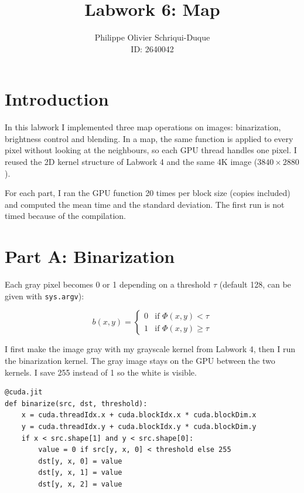 \documentclass{report}
\begin{document}
\title{Labwork 6: Map}
\author{Philippe Olivier Schriqui-Duque \\ ID: 2640042}
\date{}
\maketitle

\section*{Introduction}

In this labwork I implemented three map operations on images: binarization, brightness control and blending. In a map, the same function is applied to every pixel without looking at the neighbours, so each GPU thread handles one pixel. I reused the 2D kernel structure of Labwork 4 and the same 4K image ($3840 \times 2880$).

For each part, I ran the GPU function 20 times per block size (copies included) and computed the mean time and the standard deviation. The first run is not timed because of the compilation.

\section*{Part A: Binarization}

Each gray pixel becomes 0 or 1 depending on a threshold $\tau$ (default 128, can be given with \texttt{sys.argv}):

\[
b(x, y) = \left\{ \begin{array}{ll} 0 & \mbox{if } \Phi(x, y) < \tau \\ 1 & \mbox{if } \Phi(x, y) \geq \tau \end{array} \right.
\]

I first make the image gray with my grayscale kernel from Labwork 4, then I run the binarization kernel. The gray image stays on the GPU between the two kernels. I save 255 instead of 1 so the white is visible.

\begin{verbatim}
@cuda.jit
def binarize(src, dst, threshold):
    x = cuda.threadIdx.x + cuda.blockIdx.x * cuda.blockDim.x
    y = cuda.threadIdx.y + cuda.blockIdx.y * cuda.blockDim.y
    if x < src.shape[1] and y < src.shape[0]:
        value = 0 if src[y, x, 0] < threshold else 255
        dst[y, x, 0] = value
        dst[y, x, 1] = value
        dst[y, x, 2] = value
\end{verbatim}
\end{document}
